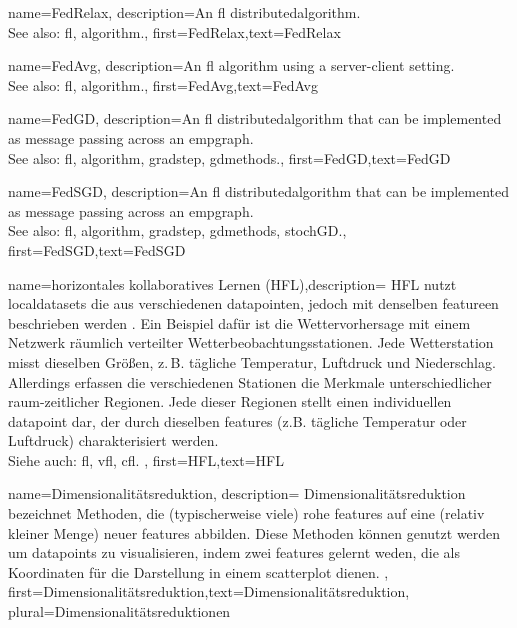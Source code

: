 {name={FedRelax},
	description={An \gls{fl} \gls{distributedalgorithm}. 
		\\ 
		See also: \gls{fl}, \gls{algorithm}.},
	first={FedRelax},text={FedRelax}
} 

{name={FedAvg},
	description={An \gls{fl} \gls{algorithm} using a server-client 
		setting. 
		\\ 
		See also: \gls{fl}, \gls{algorithm}.},
	first={FedAvg},text={FedAvg}
} 

{name={FedGD},
	description={An \gls{fl} \gls{distributedalgorithm} that 
		can be implemented as message passing across an \gls{empgraph}. 
		\\ 
		See also: \gls{fl}, \gls{algorithm}, \gls{gradstep}, \gls{gdmethods}.},
	first={FedGD},text={FedGD}
} 

{name={FedSGD},
	description={An \gls{fl} \gls{distributedalgorithm} that 
		can be implemented as message passing across an \gls{empgraph}. 
		\\ 
		See also: \gls{fl}, \gls{algorithm}, \gls{gradstep}, \gls{gdmethods}, \gls{stochGD}.},
	first={FedSGD},text={FedSGD}

{name={horizontales kollaboratives Lernen (HFL)},description=
	{HFL nutzt \glspl{localdataset} die aus verschiedenen
		\gls{datapoint}en, jedoch mit denselben \gls{feature}en beschrieben werden \cite{HFLChapter2020}.
	Ein Beispiel dafür ist die Wettervorhersage mit einem Netzwerk räumlich verteilter 
	Wetterbeobachtungsstationen. Jede Wetterstation misst dieselben Größen, 
	z. B. tägliche Temperatur, Luftdruck und Niederschlag.
		Allerdings erfassen die verschiedenen Stationen die Merkmale unterschiedlicher 
	raum-zeitlicher Regionen.
	Jede dieser Regionen stellt einen individuellen  \gls{datapoint}  dar, 
	der durch dieselben \glspl{feature}  (z.B. tägliche Temperatur oder Luftdruck) charakterisiert werden. \\
	Siehe auch: \gls{fl}, \gls{vfl}, \gls{cfl}. },
	first={HFL},text={HFL}
}

{name={Dimensionalitätsreduktion},
	description= Dimensionalitätsreduktion  bezeichnet Methoden, die 
	(typischerweise viele) rohe  \glspl{feature} auf eine (relativ kleiner Menge)  neuer  \glspl{feature} abbilden.
	Diese Methoden können genutzt werden um \glspl{datapoint} zu visualisieren, indem zwei  \glspl{feature}
	gelernt weden, die als Koordinaten für die Darstellung in einem \gls{scatterplot} dienen. },
	 first={Dimensionalitätsreduktion},text={Dimensionalitätsreduktion}, plural={Dimensionalitätsreduktionen}
} 


